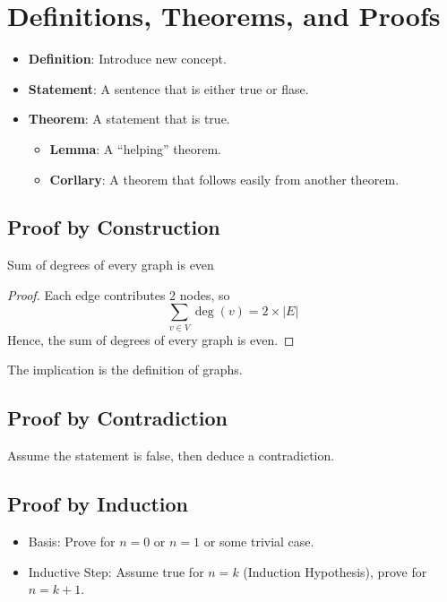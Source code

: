 \newpage

\section{Definitions, Theorems, and Proofs}

\begin{itemize}
    \item \textbf{Definition}: Introduce new concept.
    \item \textbf{Statement}: A sentence that is either true or flase.
    \item \textbf{Theorem}: A statement that is true.
    \begin{itemize}
        \item \textbf{Lemma}: A ``helping'' theorem.
        \item \textbf{Corllary}: A theorem that follows easily from another theorem.
    \end{itemize}
\end{itemize}

\subsection{Proof by Construction}
\begin{proposition}
    Sum of degrees of every graph is even
\end{proposition}
\begin{proof}
    Each edge contributes 2 nodes, so
    \[
    \sum_{v \in V} \deg(v) = 2 \times |E|
    \]
    Hence, the sum of degrees of every graph is even.
\end{proof}

\begin{note}
    The implication is the definition of graphs.
\end{note}

\subsection{Proof by Contradiction}

Assume the statement is false, then deduce a contradiction.

\subsection{Proof by Induction}

\begin{itemize}
    \item Basis: Prove for $n=0$ or $n=1$ or some trivial case.
    \item Inductive Step: Assume true for $n=k$ (Induction Hypothesis), prove for $n=k+1$.
\end{itemize}

